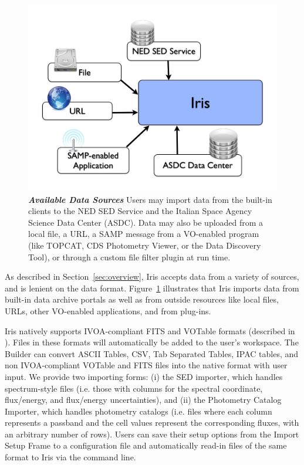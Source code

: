 \documentclass[final,5p,authoryear]{elsarticle}
\begin{document}
\begin{figure} \begin{center}
\includegraphics[width=\columnwidth]{figures/IrisDiagrams.002.png}
\caption{\textit{\textbf{\label{fig:data_sources} Available Data
Sources}}\textit{}\textbf{}\textit{} Users may import data from the built-in
clients to the NED SED Service and the Italian Space Agency Science Data Center
(ASDC). Data may also be uploaded from a local file, a URL, a SAMP message from
a VO-enabled program (like TOPCAT, CDS Photometry Viewer, or the Data Discovery
Tool), or through a custom file filter plugin at run time.} \end{center}
\end{figure}

As described in Section~\ref{sec:overview}, Iris accepts data from a variety of
sources, and is lenient on the data format. Figure~\ref{fig:data_sources}
illustrates that Iris imports data from built-in data archive portals as well as
from outside resources like local files, URLs, other VO-enabled applications,
and from plug-ins.

Iris natively supports IVOA-compliant FITS and VOTable formats (described in
\citet{2012arXiv1204.3055M}). Files in these formats will automatically be added
to the user's workspace. The Builder can convert ASCII Tables, CSV,
Tab Separated Tables, IPAC tables, and non IVOA-com\-pli\-ant VOTable and FITS files
into the native format with user input. We provide two importing forms: (i) the
SED importer, which handles spectrum-style files (i.e. those with columns for
the spectral coordinate, flux/energy, and flux/energy uncertainties), and (ii)
the Photometry Catalog Importer, which handles photometry catalogs (i.e. files
where each column represents a passband and the cell values represent the
corresponding fluxes, with an arbitrary number of rows). Users can save their
setup options from the Import Setup Frame to a configuration file and
automatically read-in files of the same format to Iris via the command line.
\end{document}
